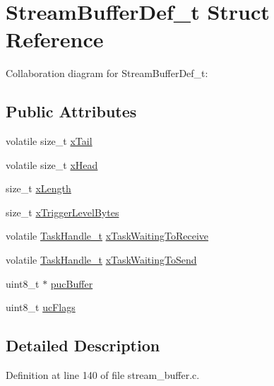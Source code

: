 \hypertarget{struct_stream_buffer_def__t}{}\section{Stream\+Buffer\+Def\+\_\+t Struct Reference}
\label{struct_stream_buffer_def__t}


Collaboration diagram for Stream\+Buffer\+Def\+\_\+t\+:
\subsection*{Public Attributes}
\begin{DoxyCompactItemize}
\item 
volatile size\+\_\+t \hyperlink{struct_stream_buffer_def__t_a937e441ed6c946a099d52b5955d7302c}{x\+Tail}
\item 
volatile size\+\_\+t \hyperlink{struct_stream_buffer_def__t_a75aafb9fdee8f0666837302bd9b12341}{x\+Head}
\item 
size\+\_\+t \hyperlink{struct_stream_buffer_def__t_a6eedf41c877edd42b3b460780d1b6555}{x\+Length}
\item 
size\+\_\+t \hyperlink{struct_stream_buffer_def__t_a4a7ee9b374cc0b358d049811def8d595}{x\+Trigger\+Level\+Bytes}
\item 
volatile \hyperlink{externals_2freertos_2include_2task_8h_a25b35e6e19ecf894173e7ff95edb96ef}{Task\+Handle\+\_\+t} \hyperlink{struct_stream_buffer_def__t_a8377ae8625121efa22d66e678add4057}{x\+Task\+Waiting\+To\+Receive}
\item 
volatile \hyperlink{externals_2freertos_2include_2task_8h_a25b35e6e19ecf894173e7ff95edb96ef}{Task\+Handle\+\_\+t} \hyperlink{struct_stream_buffer_def__t_a85b1cf05c0222f8d67a64f7d01722e52}{x\+Task\+Waiting\+To\+Send}
\item 
uint8\+\_\+t $\ast$ \hyperlink{struct_stream_buffer_def__t_a4e05054a8a3d61a5cec0c18a70bbdb67}{puc\+Buffer}
\item 
uint8\+\_\+t \hyperlink{struct_stream_buffer_def__t_a1afd02d997a1cb3149e3cf203c681d58}{uc\+Flags}
\end{DoxyCompactItemize}


\subsection{Detailed Description}


Definition at line 140 of file stream\+\_\+buffer.\+c.



